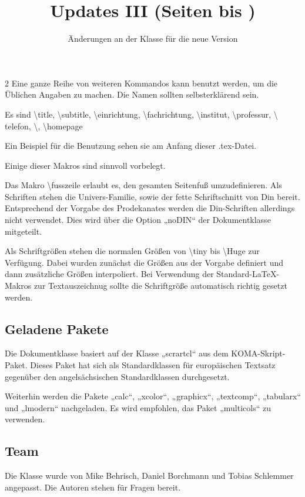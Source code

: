 \documentclass[a0paper,noDIN,MathematikA0]{tudmathposter}
\begin{document}
\begin{multicols}2
  Eine ganze Reihe von weiteren Kommandos kann benutzt werden, um
  die Üblichen Angaben zu machen. Die Namen sollten selbsterklärend
  sein.

  Es sind \textbackslash title, \textbackslash subtitle,
  \textbackslash einrichtung, \textbackslash fachrichtung,
  \textbackslash institut, \textbackslash professur, \textbackslash
  telefon, \textbackslash \fax, \textbackslash homepage
  
  Ein Beispiel für die Benutzung sehen sie am Anfang dieser .tex-Datei.
  
  Einige dieser Makros sind sinnvoll vorbelegt.
  
  Das Makro
  \textbackslash fusszeile erlaubt es, den gesamten Seitenfuß
  umzudefinieren.
  Als Schriften stehen die Univers-Familie, sowie der fette
  Schriftschnitt von Din bereit. Entsprechend der Vorgabe des
  Prodekanates werden die Din-Schriften allerdings nicht
  verwendet. Dies wird über die Option „noDIN“ der Dokumentklasse
  mitgeteilt.

  Als Schriftgrößen stehen die normalen Größen von \textbackslash tiny
  bis \textbackslash Huge zur Verfügung. Dabei wurden zunächst die
  Größen aus der Vorgabe definiert und dann zusätzliche Größen
  interpoliert. Bei Verwendung der Standard-\LaTeX-Makros zur
  Textauszeichnug sollte die Schriftgröße automatisch richtig gesetzt
  werden.
  \enlargethispage{4\baselineskip}
\subsection{Geladene Pakete}
  Die Dokumentklasse basiert auf der Klasse „scrartcl“ aus dem
  KOMA-Skript-Paket. Dieses Paket hat sich als Standardklassen für
  europäischen Textsatz gegenüber den angelsächsischen Standardklassen
  durchgesetzt.

  Weiterhin werden die Pakete „calc“, „xcolor“, „graphicx“,
  „textcomp“, „tabularx“ und „lmodern“ nachgeladen. Es wird empfohlen,
  das Paket „multicols“ zu verwenden.

  \subsection{Team}
  Die Klasse wurde von Mike Behrisch, Daniel Borchmann und Tobias
  Schlemmer angepasst. Die Autoren stehen für Fragen bereit.
\end{multicols}
\pagebreak
\fax{}\label{Updanfang}%
\title{Updates III (Seiten \pageref{Updanfang} bis \pageref{Updende})}%
\subtitle{Änderungen an der Klasse für die neue Version}
\maketitle
\end{document}
